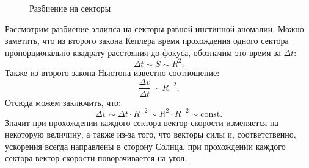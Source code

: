 \begin{wrapfigure}[11]{r}{0.55\tw}
        \caption{Разбиение на секторы}
    	\label{pic:hodograph1}    
\end{wrapfigure}
Рассмотрим разбиение эллипса на секторы равной инстинной аномалии. Можно заметить, что из второго закона Кеплера время прохождения одного сектора пропорционально квадрату расстояния до фокуса, обозначим это время за $\Delta t$:
\begin{equation*}
	\Delta t \sim S \sim R^2.
\end{equation*}
Также из второго закона Ньютона известно соотношение:
\begin{equation*}
	\frac{\Delta v}{\Delta t} \sim R^{-2}.
\end{equation*}
Отсюда можем заключить, что:
\begin{equation*}
	\Delta v \sim \Delta t \cdot R^{-2} \sim  R^2 \cdot R^{-2} \sim \text{const}.
\end{equation*}
Значит при прохождении каждого сектора вектор скорости изменяется на некоторую  величину, а также из-за того, что векторы силы и, соответственно, ускорения всегда направлены в сторону Солнца, при прохождении каждого сектора вектор скорости поворачивается на  угол.


